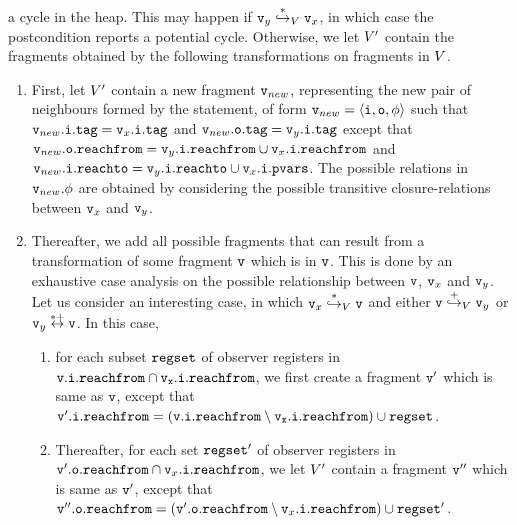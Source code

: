 a cycle in the heap. This may happen if
$\frag_y \overset{*}\hookrightarrow_{\fragset}\frag_x$, in which case the postcondition reports a potential cycle.
Otherwise, we let $\fragsetpost$ contain
the fragments obtained by the following transformations on fragments in
$\fragset$.
\begin{enumerate}
  \item
    First, let $\fragsetpost$ contain a new fragment $\frag_{new}$, representing
    the new pair of neighbours formed by the statement, of form
    $\frag_{new} = \fragtupleat{\frag_{new}}$ such that
    $\tagat{\inof{\frag_{new}}} = \tagat{\inof{\frag_x}}$ and
    $\tagat{\outof{\frag_{new}}} = \tagat{\inof{\frag_y}}$ except that
    $\reachfromat{\outof{\frag_{new}}} = \reachfromat{\inof{\frag_y}} \cup \reachfromat{\inof{\frag_x}}$ and
    $\reachtoat{\inof{\frag_{new}}} = \reachtoat{\inof{\frag_y}} \cup \pvarsat{\inof{\frag_x}}$.
    The possible relations in $\datarelof{\frag_{new}}$ are obtained by
    considering the possible transitive closure-relations between
    $\frag_x$ and $\frag_y$.
  \item
    Thereafter, we add all possible fragments that can result from a transformation
of some fragment $\frag$ which is in $\frag$. This is done by an exhaustive
case analysis on the possible
relationship between $\frag$, $\frag_x$ and $\frag_y$.
Let us consider an interesting case, in which
$\frag_x \overset{*}\hookrightarrow_{\fragset} \frag$ and either $\frag \overset{+}\hookrightarrow_{\fragset} \frag_y$ or $\frag_y \overset{*+}\leftrightarrow \frag$.
In this case,
\begin{enumerate}
\item
  for each subset $\regset$ of observer registers in $\tt \reachfromat{\inof{\frag}} \cap \reachfromat{\inof{\frag_x}}$, we first create
  a fragment $\frag'$ which is same as $\frag$, except that $\reachfromat{\inof{\frag'}} = (\tt \reachfromat{\inof{\frag}} \setminus \reachfromat{\inof{\frag_x}}) \cup \regset$.
\item
  Thereafter, 
for each set $\regset'$ of observer registers in $\reachfromat{\outof{\frag'}} \cap \reachfromat{\inof{\frag_x}}$,  we let $\fragsetpost$ contain a fragment
$\frag''$ which is same as $\frag'$, except that $\reachfromat{\outof{\frag''}} = (\reachfromat{\outof{\frag'}} \setminus \reachfromat{\inof{\frag_x}}) \cup \regset'$. 
\end{enumerate}
\end{enumerate}

